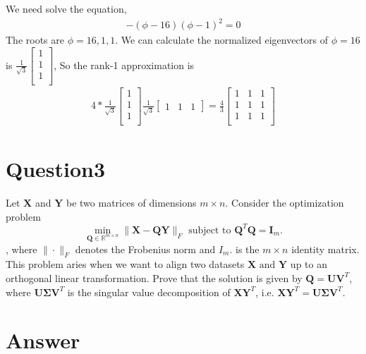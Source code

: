 \documentclass{article}
\newcommand{\R}{\mathbb{R}}
\begin{document}
We need solve the equation, 
\begin{align*}
    -(\phi - 16)(\phi - 1)^2 = 0
\end{align*}
The roots are \(\phi = 16, 1, 1\). 
We can calculate the normalized eigenvectors of \(\phi = 16\) is \(\frac{1}{\sqrt{3}}\begin{bmatrix}
    1 \\
    1 \\
    1 \\
\end{bmatrix}\),
So the rank-1 approximation is
\begin{align*}
    4 * \frac{1}{\sqrt{3}} \begin{bmatrix}
       1 \\ 
       1 \\ 
       1 \\ 
    \end{bmatrix} \frac{1}{\sqrt{3}} \begin{bmatrix}
        1 & 1 & 1
    \end{bmatrix} = \frac{4}{3} \begin{bmatrix}
        1 & 1 & 1 \\
        1 & 1 & 1 \\
        1 & 1 & 1 \\
    \end{bmatrix}
\end{align*}




\section*{Question3}
Let \(\bm{X}\) and \(\bm{Y}\) be two matrices of dimensions \(m \times n\). Consider the optimization problem
\[
    \min_{\bm{Q}\in\R^{m\times n}} \|\bm{X} - \bm{QY}\|_F \text{ subject to } \bm{Q}^T\bm{Q} = \bm{I}_m.
\],
where \(\|\cdot\|_F\) denotes the Frobenius norm and \(I_m\). is the \(m \times n\) identity matrix. This problem aries when we want to align two datasets \(\bm{X} \text{ and }\bm{Y}\) up to an orthogonal linear transformation. Prove that the solution is given by \(\bm{Q} = \bm{U}\bm{V}^T\), where \(\bm{U}\bm{\Sigma}\bm{V}^T\) is the singular value decomposition of \(\bm{XY}^T\), i.e. \(\bm{X}\bm{Y}^T = \bm{U}\bm{\Sigma}\bm{V}^T\).

\section*{Answer}
\end{document}
